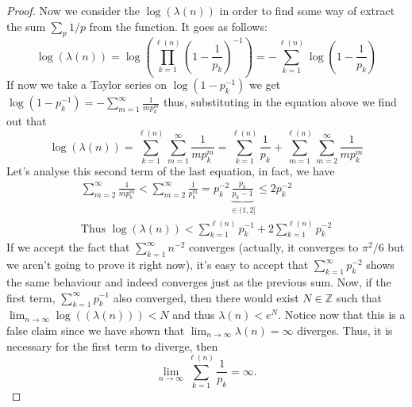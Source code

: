 \begin{proof}
    Now we consider the \(\log(\lambda(n))\) in order to find some way of extract
    the sum \(\sum_p 1/p\) from the function. It goes as follows:
    \[
        \log(\lambda(n))
        = \log \left( \prod_{k=1}^{\ell(n)} \left(1 - \frac{1}{p_k}\right)^{-1} \right)
        = - \sum_{k=1}^{\ell(n)} \log \left( 1 - \frac{1}{p_k} \right)
    \]
    If now we take a Taylor series on \(\log(1 - p_k^{-1})\) we get
    \(\log(1-p_k^{-1}) = -\sum_{m=1}^\infty \frac{1}{m p_k^m}\) thus, substituting
    in the equation above we find out that
    \[
        \log(\lambda(n)) = \sum_{k=1}^{\ell(n)} \sum_{m = 1}^\infty \frac{1}{mp_k^m}
        = \sum_{k = 1}^{\ell(n)} \frac{1}{p_k} + \sum_{m = 1}^{\ell(n)}
        \sum_{m=2}^\infty \frac{1}{mp_k^{m}}
    \]
    Let's analyse this second term of the last equation, in fact, we have
    \begin{gather*}
        \sum_{m=2}^\infty \frac{1}{mp_k^{m}} < \sum_{m=2}^\infty \frac{1}{p_k^m} =
        p_k^{-2} \underbrace{\frac{p_k}{p_k - 1}}_{\in (1, 2]} \leqslant 2 p_k^{-2}
        \\
        \text{Thus } \log(\lambda(n)) < \sum_{k=1}^{\ell(n)} p_k^{-1} + 2
        \sum_{k=1}^{\ell(n)} p_k^{-2}
    \end{gather*}
    If we accept the fact that \(\sum_{k = 1}^\infty n^{-2}\) converges
    (actually, it converges to \(\pi^2/6\) but we aren't going to prove it right
    now), it's easy to accept that \(\sum_{k = 1}^\infty p_k^{-2}\) shows the
    same behaviour and indeed converges just as the previous sum. Now, if the
    first term,  \(\sum_{k=1}^\infty p_k^{-1}\) also converged, then there would
    exist \(N \in \mathbb{Z}\) such that \(\lim_{n\to\infty}\log((\lambda(n))) <
    N\) and thus \(\lambda(n) < e^N\). Notice now that this is a false claim
    since we have shown that \(\lim_{n \to \infty} \lambda(n) = \infty\)
    diverges. Thus, it is necessary for the first term to diverge, then
    \[
        \lim_{n \to \infty} \sum_{k=1}^{\ell(n)} \frac{1}{p_k} = \infty.
    \]
\end{proof}
